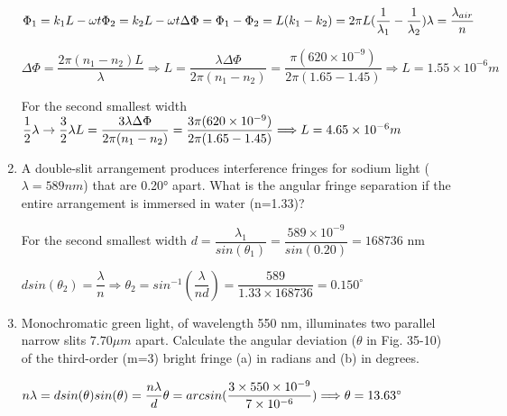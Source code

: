 \documentclass[fleqn]{article}
\begin{document}
\begin{enumerate}
    \textcolor{hwColor}{
      $
        \Phi_1=k_1L-\omega t \\
        \Phi_2=k_2L-\omega t \\
        \Delta\Phi=\Phi_1-\Phi_2=L(k_1-k_2)=2\pi L(\dfrac{1}{\lambda_1}-\dfrac{1}{\lambda_2}) \\
        \lambda=\dfrac{\lambda_{air}}{n}
      $
    }

    \textcolor{hwColor}{
      $
        \Delta \Phi=\dfrac{2\pi(n_1-n_2)L}{\lambda} \Longrightarrow L=\dfrac{\lambda \Delta \Phi}{2\pi(n_1-n_2)}=\dfrac{\pi(620\times 10^{-9})}{2\pi (1.65-1.45)} \Longrightarrow L=1.55 \times 10^{-6} m
      $
    }

    \bigbreak 

    \textcolor{hwColor}{
      For the second smallest width 
      $
        \dfrac{1}{2}\lambda \rightarrow \dfrac{3}{2}\lambda \\
        L=\dfrac{3\lambda \Delta \Phi}{2\pi(n_1-n_2)}=\dfrac{3\pi (620 \times 10^{-9})}{2\pi (1.65-1.45)} \Longrightarrow L=4.65 \times 10^{-6} m
      $
    }

    \item A double-slit arrangement produces interference fringes for sodium light ($\lambda=589 nm$) that are 0.20° apart. What is the angular fringe separation if the entire arrangement is immersed in water (n=1.33)?

    \textcolor{hwColor}{
      For the second smallest width
      $
        d=\dfrac{\lambda_1}{sin(\theta_1)}=\dfrac{589 \times 10^{-9}}{sin(0.20)}=168736 
      $ nm
    }

    \textcolor{hwColor}{
      $
        dsin(\theta_2)=\dfrac{\lambda}{n} \Longrightarrow \theta_2=sin^{-1}(\dfrac{\lambda}{nd})=\dfrac{589}{1.33 \times 168736}=0.150^{\circ}
      $
    }

    \item Monochromatic green light, of wavelength 550 nm, illuminates two parallel narrow slits $7.70 \mu m$ apart. Calculate the angular deviation ($\theta$ in Fig. 35-10) of the third-order (m=3) bright fringe (a) in radians and (b) in degrees.

    \textcolor{hwColor}{
      $
        n\lambda=d sin(\theta) \\
        sin(\theta)=\dfrac{n \lambda }{d} \\
        \theta = arcsin(\dfrac{3 \times 550 \times 10^{-9}}{7 \times 10^{-6}}) \\
        \Longrightarrow \theta = 13.63^{\circ}
      $
    }


\end{enumerate}
\end{document}
